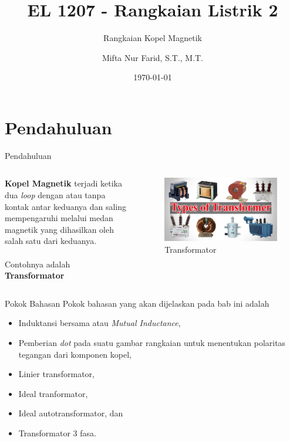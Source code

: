 \documentclass[10pt]{beamer}
\title{EL 1207 - Rangkaian Listrik 2}
\subtitle{Rangkaian Kopel Magnetik}
\date{\today}
\author{Mifta Nur Farid, S.T., M.T.}
\institute{Teknik Elektro - Institut Teknologi Kalimantan \\ Karang Joang, Balikpapan}
\begin{document}
\maketitle

\section{Pendahuluan}

\begin{frame}{Pendahuluan}
    \begin{columns}[T,onlytextwidth]
        
        \parbox{\linewidth}{\textbf{Kopel Magnetik} terjadi ketika dua \emph{loop} dengan atau tanpa kontak antar keduanya dan saling mempengaruhi melalui medan magnetik yang dihasilkan oleh salah satu dari keduanya.\\~\\
        Contohnya adalah \textbf{Transformator}}

        \begin{figure}
            \includegraphics[width=\linewidth]{trafo.jpg}
            \caption[trafo]{Transformator}
        \end{figure}

    \end{columns}
\end{frame}

\begin{frame}{Pokok Bahasan}
    Pokok bahasan yang akan dijelaskan pada bab ini adalah 
    \begin{itemize}
        \item Induktansi bersama atau \emph{Mutual Inductance},
        \item Pemberian \emph{dot} pada suatu gambar rangkaian untuk menentukan polaritas tegangan dari komponen kopel,
        \item Linier transformator,
        \item Ideal tranformator,
        \item Ideal autotransformator, dan
        \item Transformator 3 fasa.
    \end{itemize}
\end{frame}
\end{document}
